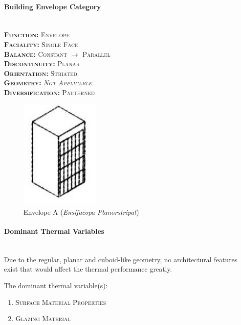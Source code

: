 \setlength{\columnseprule}{0pt}
\begin{multicols}{2}
	\paragraph{Building Envelope Category}\mbox{}\\
	\vspace {1cm}	
	\small \textsc{\textbf{Function:} Envelope\\
	\vspace {0.3cm}
	\textbf{Faciality:} Single Face\\
	\vspace {0.3cm}
	\textbf{Balance:} Constant $\rightarrow$ Parallel\\
	\vspace {0.3cm}
	\textbf{Discontinuity:} Planar\\
	\vspace {0.3cm}
	\textbf{Orientation:} Striated\\
	\vspace {0.3cm}
	\textbf{Geometry:} \emph{Not Applicable}\\
	\vspace {0.3cm}
	\textbf{Diversification:} Patterned\\}
	\normalsize
	\columnbreak
	\begin{figure}[H]
		\centering
		\includegraphics[width=0.35\textwidth]{./Images/10-Envelope1}
		\caption[Envelope A]{Envelope A (\emph{Ensifacopa Planorstripat})\cite{foa04}}
	\end{figure}
\end{multicols}


\paragraph{Dominant Thermal Variables}\mbox{}\\

Due to the regular, planar and cuboid-like geometry, no architectural features exist that would affect the thermal performance greatly.

The dominant thermal variable(s):
\vspace{-0.3cm}
\begin{enumerate}
	\item \textsc{Surface Material Properties}
	\item \textsc{Glazing Material}
\end{enumerate}

